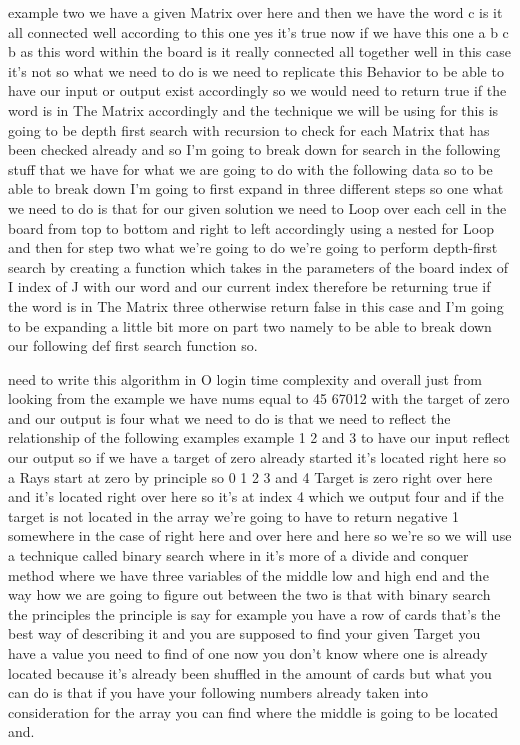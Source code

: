 \expandafter\def\csname sourceexcerpt@70\endcsname{%
example two we have a given Matrix over here and then we have the word c is it all
connected well according to this one yes it's true now if we have this one a b c b as
this word within the board is it really connected all together well in this case it's
not so what we need to do is we need to replicate this Behavior to be able to have our
input or output exist accordingly so we would need to return true if the word is in
The Matrix accordingly and the technique we will be using for this is going to be
depth first search with recursion to check for each Matrix that has been checked
already and so I'm going to break down for search in the following stuff that we have
for what we are going to do with the following data so to be able to break down I'm
going to first expand in three different steps so one what we need to do is that for
our given solution we need to Loop over each cell in the board from top to bottom and
right to left accordingly using a nested for Loop and then for step two what we're
going to do we're going to perform depth-first search by creating a function which takes
in the parameters of the board index of I index of J with our word and our current
index therefore be returning true if the word is in The Matrix three otherwise return
false in this case and I'm going to be expanding a little bit more on part two namely
to be able to break down our following def first search function so.
}

\expandafter\def\csname sourceexcerpt@71\endcsname{%
need to write this algorithm in O login time complexity and overall just from looking
from the example we have nums equal to 45 67012 with the target of zero and our output
is four what we need to do is that we need to reflect the relationship of the
following examples example 1 2 and 3 to have our input reflect our output so if we
have a target of zero already started it's located right here so a Rays start at zero
by principle so 0 1 2 3 and 4 Target is zero right over here and it's located right
over here so it's at index 4 which we output four and if the target is not located in
the array we're going to have to return negative 1 somewhere in the case of right here
and over here and here so we're so we will use a technique
called binary search where in it's more of a divide and conquer method where we have
three variables of the middle low and high end and the way how we are going to figure
out between the two is that with binary search the principles the principle is say for
example you have a row of cards that's the best way of describing it and you are
supposed to find your given Target you have a value you need to find of one now you
don't know where one is already located because it's already been shuffled in the
amount of cards but what you can do is that if you have your following numbers already
taken into consideration for the array you can find where the middle is going to be
located and.
}

